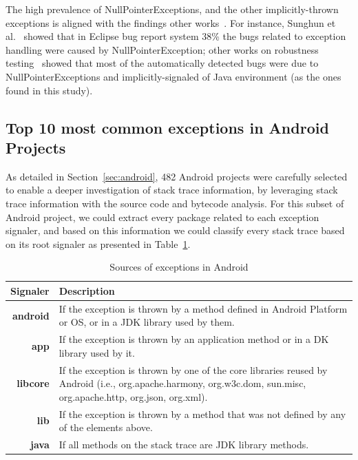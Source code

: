 \documentclass[conference]{IEEEtran}
\begin{document}
The high prevalence of NullPointerExceptions, and the other implicitly-thrown
exceptions  is aligned with the findings other works~\cite{kim2013predicting,fraser20131600,csallner2004jcrasher}. For instance, Sunghun et
al.~\cite{kim2013predicting} showed that in Eclipse bug report system 38\% the bugs related to exception handling were caused by NullPointerException; other works on robustness testing~\cite{maji2012empirical,csallner2004jcrasher}
showed that most of the automatically
detected bugs were due to NullPointerExceptions and implicitly-signaled of Java
environment (as the ones found in this study).

\subsection{Top 10 most common exceptions in Android Projects}

As detailed in Section~\ref{sec:android}, 482 Android projects were carefully
selected to enable a deeper investigation of stack trace information, by
leveraging stack trace information with the source code and bytecode analysis.
For this subset of Android project, we could extract every package related to
each exception signaler, and based on this information we could classify every
stack trace based on its root signaler as presented in Table~\ref{tab:signalers}.

\begin{table}
  \centering
  \begin{tabular}{rp{29em}}
    \hline
    \bfseries{Signaler} & \bfseries{Description} \\
    \hline
    \bfseries{android} & If the exception is thrown by a method defined in Android Platform or OS, or in a JDK library used by them.\\
    \bfseries{app}     & If the exception is thrown by an application method or in a  DK library used by it.\\
    \bfseries{libcore} & If the exception is thrown by one of the core libraries reused by Android (i.e., org.apache.harmony, org.w3c.dom, sun.misc, org.apache.http, org.json, org.xml). \\
    \bfseries{lib}     & If the exception is thrown by a method that was not defined by any of the elements above.\\
    \bfseries{java}    & If all methods on the stack trace are JDK library methods.\\
    \hline
  \end{tabular}
  \caption{Sources of exceptions in Android}
  \label{tab:signalers}
\end{table}
\end{document}

